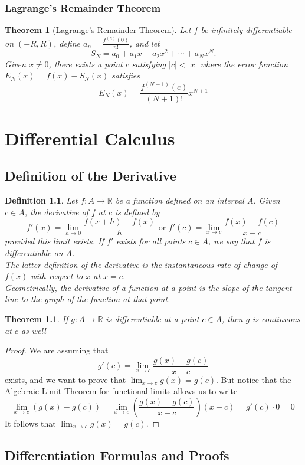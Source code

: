 \documentclass[10pt]{report}
\newtheorem{thm2}{Theorem}[section]
\newtheorem{thm3}{Theorem}[subsection]
\newtheorem{def2}{Definition}[section]
\begin{document}
\subsection{Lagrange's Remainder Theorem}
\begin{thm3}[Lagrange's Remainder Theorem]
Let $f$ be infinitely differentiable on $(-R,R)$, define $a_n=\frac{f^{(n)}(0)}{n!}$, and let
$$S_N = a_0 + a_1x+a_2x^2 + \cdots + a_Nx^N.$$
Given $x\neq 0$, there exists a point $c$ satisfying $|c|<|x|$ where the error function $E_N(x) = f(x)-S_N(x)$ satisfies
$$E_N(x) = \frac{f^{(N+1)}(c)}{(N+1)!}x^{N+1}$$
\end{thm3}
\chapter{Differential Calculus}
\section{Definition of the Derivative}
\begin{def2}Let $f:A\to\mathbb{R}$ be a function defined on an interval $A$. Given $c\in A$, the derivative of $f$ at $c$ is defined by
$$f'(x) = \lim_{h\to 0}\frac{f(x+h)-f(x)}{h} \text{ or } f'(c)=\lim_{x\to c}\frac{f(x)-f(c)}{x-c}$$
provided this limit exists. If $f'$ exists for all points $c\in A$, we say that $f$ is differentiable on $A$.\\
The latter definition of the derivative is the instantaneous rate of change of $f(x)$ with respect to $x$ at $x=c$.\\
Geometrically, the derivative of a function at a point is the slope of the tangent line to the graph of the function at that point.
\end{def2}
\begin{thm2}
If $g:A\to \mathbb{R}$ is differentiable at a point $c\in A$, then $g$ is continuous at $c$ as well
\end{thm2}
\begin{proof}
We are assuming that
$$g'(c)=\lim_{x\to c}\frac{g(x)-g(c)}{x-c}$$
exists, and we want to prove that $\lim_{x\to c}g(x)=g(c)$. But notice that the Algebraic Limit Theorem for functional limits allows us to write
$$\lim_{x\to c}(g(x)-g(c)) = \lim_{x\to c}\left(\frac{g(x)-g(c)}{x-c}\right)(x-c) = g'(c)\cdot 0 = 0$$
It follows that $\lim_{x\to c}g(x) = g(c)$.
\end{proof}
\section{Differentiation Formulas and Proofs}
\end{document}
